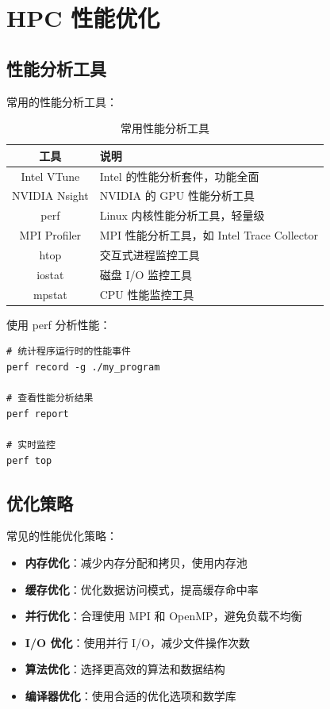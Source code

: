 \documentclass[12pt,UTF8]{ctexbook}
\begin{document}
\chapter{HPC 性能优化}
\label{chap:performance_optimization}

\section{性能分析工具}
\label{sec:performance_tools}

常用的性能分析工具：

\begin{table}[htbp]
    \centering
    \caption{常用性能分析工具}
    \begin{tabular}{|c|p{8cm}|}
        \hline
        \textbf{工具} & \textbf{说明} \\
        \hline
        Intel VTune & Intel 的性能分析套件，功能全面 \\
        \hline
        NVIDIA Nsight & NVIDIA 的 GPU 性能分析工具 \\
        \hline
        perf & Linux 内核性能分析工具，轻量级 \\
        \hline
        MPI Profiler & MPI 性能分析工具，如 Intel Trace Collector \\
        \hline
        htop & 交互式进程监控工具 \\
        \hline
        iostat & 磁盘 I/O 监控工具 \\
        \hline
        mpstat & CPU 性能监控工具 \\
        \hline
    \end{tabular}
\end{table}

使用 perf 分析性能：
\begin{verbatim}
# 统计程序运行时的性能事件
perf record -g ./my_program

# 查看性能分析结果
perf report

# 实时监控
perf top
\end{verbatim}

\section{优化策略}
\label{sec:optimization_strategies}

常见的性能优化策略：

\begin{itemize}
    \item \textbf{内存优化}：减少内存分配和拷贝，使用内存池
    \item \textbf{缓存优化}：优化数据访问模式，提高缓存命中率
    \item \textbf{并行优化}：合理使用 MPI 和 OpenMP，避免负载不均衡
    \item \textbf{I/O 优化}：使用并行 I/O，减少文件操作次数
    \item \textbf{算法优化}：选择更高效的算法和数据结构
    \item \textbf{编译器优化}：使用合适的优化选项和数学库
\end{itemize}
\end{document}

